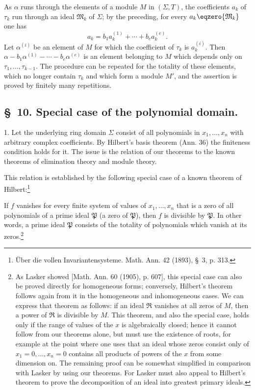 \documentclass[11pt]{article}
\newcommand{\ideal}[1]{\mathfrak{#1}}
\begin{document}
As $\alpha$ runs through the elements of a module $M$ in $(\Sigma,T)$, the coefficients $a_k$ of $\tau_k$ run through an ideal $\ideal M_k$ of $\Sigma$; by the preceding, for every $a_k\eqzero{\ideal M_k}$ one has
\[
 a_k=b_1a_k^{(1)}+\cdots+b_ea_k^{(e)}.
\]
Let $\alpha^{(i)}$ be an element of $M$ for which the coefficient of $\tau_k$ is $a_k^{(i)}$. Then $\alpha-b_1\alpha^{(1)}-\cdots-b_e\alpha^{(e)}$ is an element belonging to $M$ which depends only on $\tau_1,
\ldots,\tau_{k-1}$. The procedure can be repeated for the totality of these elements, which no longer contain $\tau_k$ and which form a module $M'$, and the assertion is proved by finitely many repetitions.

\subsection*{\S~10. Special case of the polynomial domain.}

1. Let the underlying ring domain $\Sigma$ consist of all polynomials in $x_1,
\ldots,x_n$ with arbitrary complex coefficients. By Hilbert's basis theorem (Ann. 36) the finiteness condition holds for it. The issue is the relation of our theorems to the known theorems of elimination theory and module theory.

This relation is established by the following special case of a known theorem of Hilbert:\footnote{Über die vollen Invariantensysteme. Math. Ann. 42 (1893), \S~3, p. 313.}

If $f$ vanishes for every finite system of values of $x_1,
\ldots,x_n$ that is a zero of all polynomials of a prime ideal $\ideal P$ (a zero of $\ideal P$), then $f$ is divisible by $\ideal P$. In other words, a prime ideal $\ideal P$ consists of the totality of polynomials which vanish at its zeros.\footnote{As Lasker showed [Math. Ann. 60 (1905), p. 607], this special case can also be proved directly for homogeneous forms; conversely, Hilbert's theorem follows again from it in the homogeneous and inhomogeneous cases. We can express that theorem as follows: if an ideal $\ideal R$ vanishes at all zeros of $M$, then a power of $\ideal R$ is divisible by $M$. This theorem, and also the special case, holds only if the range of values of the $x$ is algebraically closed; hence it cannot follow from our theorems alone, but must use the existence of roots, for example at the point where one uses that an ideal whose zeros consist only of $x_1=0,
\ldots,x_n=0$ contains all products of powers of the $x$ from some dimension on. The remaining proof can be somewhat simplified in comparison with Lasker by using our theorems. For Lasker must also appeal to Hilbert's theorem to prove the decomposition of an ideal into greatest primary ideals.}
\end{document}
